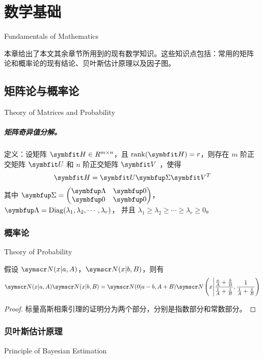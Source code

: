 \documentclass[type=master]{../gdutthesis}
\newcommand{\mbfit}{\symbfit}
\newcommand{\mbf}{\symbfup}
\newcommand{\mscr}{\symscr}
\DeclareMathOperator*{\Diag}{Diag}
\begin{document}
\chapter{数学基础}{Fundamentals of Mathematics}

本章给出了本文其余章节所用到的现有数学知识。这些知识点包括：常用的矩阵
论和概率论的现有结论、贝叶斯估计原理以及因子图。

\section{矩阵论与概率论}{Theory of Matrices and Probability}

\paragraph{矩阵奇异值分解。}

定义：设矩阵 $\mbfit H \in R^{m \times n}$，且 $\rank(\mbfit H) = r$，则存在
$m$ 阶正交矩阵 $\mbfit U$ 和 $n$ 阶正交矩阵 $\mbfit V$ ，使得
\begin{align}
  \mbfit H = \mbfit U \mbf \Sigma \mbfit V^T
\end{align}
其中 $\mbf \Sigma = \begin{pmatrix}
  \mbf \Lambda & \mbf 0 \\
  \mbf 0       & \mbf 0
\end{pmatrix}$，
$\mbf \Lambda = \Diag ( \lambda_1, \lambda_2, \cdots, \lambda_r )$，
并且 $\lambda_1 \geqslant \lambda_2 \geqslant \cdots \geqslant \lambda_r \geqslant 0$。

\subsection{概率论}{Theory of Probability}
\begin{lemma}[标量高斯相乘引理]
  假设 $\mscr N ( x | a, A )$，$\mscr N ( x | b, B )$，则有
  \begin{align}
    \mscr N ( x | a, A ) \mscr N ( x | b, B ) = \mscr N ( 0 | a - b, A + B ) \mscr N \left( x \middle| \frac{ \frac{a}{A} + \frac{b}{B} }{ \frac{1}{A} + \frac{1}{B} }, \frac{ 1 }{ \frac{1}{A} + \frac{1}{B} } \right)
  \end{align}
\end{lemma}
\begin{proof}
  标量高斯相乘引理的证明分为两个部分，分别是指数部分和常数部分。
\end{proof}

\subsection{贝叶斯估计原理}{Principle of Bayesian Estimation}
\end{document}
